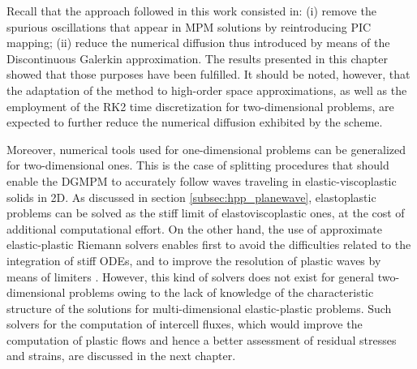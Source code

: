 Recall that the approach followed in this work consisted in: (i) remove the spurious oscillations that appear in MPM solutions by reintroducing PIC mapping; (ii) reduce the numerical diffusion thus introduced by means of the Discontinuous Galerkin approximation.
The results presented in this chapter showed that those purposes have been fulfilled.
It should be noted, however, that the adaptation of the method to high-order space approximations, as well as the employment of the RK2 time discretization for two-dimensional problems, are expected to further reduce the numerical diffusion exhibited by the scheme. 


Moreover, numerical tools used for one-dimensional problems can be generalized for two-dimensional ones. 
This is the case of splitting procedures that should enable the DGMPM to accurately follow waves traveling in elastic-viscoplastic solids in 2D. 
As discussed in section \ref{subsec:hpp_planewave}, elastoplastic problems can be solved as the stiff limit of elastoviscoplastic ones, at the cost of additional computational effort.
On the other hand, the use of approximate elastic-plastic Riemann solvers enables first to avoid the difficulties related to the integration of stiff ODEs, and to improve the resolution of plastic waves by means of limiters \cite{Thomas_EP}. 
However, this kind of solvers does not exist for general two-dimensional problems owing to the lack of knowledge of the characteristic structure of the solutions for multi-dimensional elastic-plastic problems. 
Such solvers for the computation of intercell fluxes, which would improve the computation of plastic flows and hence a better assessment of residual stresses and strains, are discussed in the next chapter. 

